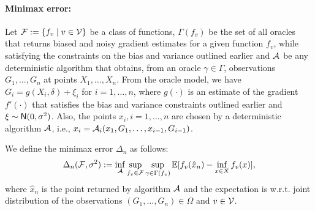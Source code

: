 
\paragraph{Minimax error:}
Let $\mathcal{F}:= \{ f_v \mid v \in \mathcal{V}\}$ be a class of functions, $\Gamma(f_v)$ be the set of all oracles that returns biased and noisy gradient estimates for a given  function $f_v$, while satisfying the constraints on the bias and variance outlined earlier and $\mathcal{A}$ be any deterministic algorithm that obtains, from an oracle $\gamma \in \Gamma$, observations $G_1, \ldots, G_n$ at points $X_1, \ldots, X_n$. From the oracle model, we have 
$G_i = g(X_i,\delta) + \xi_i$ for $i=1,\ldots,n$, where $g(\cdot)$ is an estimate of the gradient $f'(\cdot)$ that satisfies the bias and variance constraints outlined earlier and $\xi \sim \mathsf{N}(0,\sigma^2)$. Also, the points $x_i, i=1,\ldots,n$ are chosen by a deterministic algorithm $\mathcal{A}$, i.e., 
$x_i = \mathcal{A}_i(x_1, G_1, \ldots, x_{i-1}, G_{i-1})$. 

We define the minimax error $\Delta_n$ as follows:
\begin{align}
  \label{eq:minimax-err}
  \Delta_n(\mathcal{F}, \sigma^2) := \inf_{\mathcal{A}} \sup_{f_v \in \mathcal{F}} \sup_{\gamma \in \Gamma(f_v)} \mathbb{E}[f_v(\hat x_n) - \inf_{x \in X}
  f_v(x)],
\end{align}
where $\hat x_n$ is the point returned by algorithm $\mathcal{A}$ and 
the expectation is w.r.t. joint distribution  of the observations $(G_1, \ldots,
G_n) \in \Omega$ and $v \in \mathcal{V}$.
